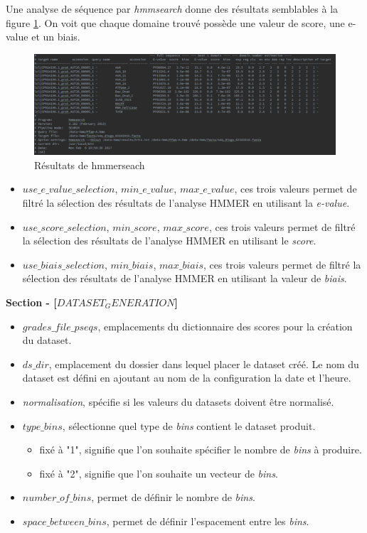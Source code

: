 Une analyse de séquence par \emph{hmmsearch} donne des résultats semblables à la figure \ref{fig:hmmseach}. On voit que chaque domaine trouvé possède une valeur de score, une e-value et un biais.

\begin{figure}[H] 
\centering 
\includegraphics[width=1\columnwidth]{img/hmmsearchresult} 
\caption[hmmseach]{Résultats de hmmerseach}
\label{fig:hmmseach} 
\end{figure}

\begin{itemize}
\item \emph{$use\_e\_value\_selection$}, \emph{$min\_e\_value$}, \emph{$max\_e\_value$}, ces trois valeurs permet de filtré la sélection des résultats de l'analyse HMMER en utilisant la \emph{e-value}.
\item \emph{$use\_score\_selection$}, \emph{$min\_score$}, \emph{$max\_score$}, ces trois valeurs permet de filtré la sélection des résultats de l'analyse HMMER en utilisant le \emph{score}.
\item \emph{$use\_biais\_selection$}, \emph{$min\_biais$}, \emph{$max\_biais$}, ces trois valeurs permet de filtré la sélection des résultats de l'analyse HMMER en utilisant la valeur de  \emph{biais}.
\end{itemize}

\textbf{Section - [$DATASET_GENERATION$]}

\begin{itemize}
\item \emph{$grades\_file\_pseqs$}, emplacements du dictionnaire des scores pour la création du dataset.
\item \emph{$ds\_dir$}, emplacement du dossier dans lequel placer le dataset créé. Le nom du dataset est défini en ajoutant au nom de la configuration la date et l'heure.
\item \emph{normalisation}, spécifie si les valeurs du datasets doivent être normalisé.
\item \emph{$type\_bins$}, sélectionne quel type de \emph{bins} contient le dataset produit.
\begin{itemize}
\item fixé à "1", signifie que l'on souhaite spécifier le nombre de \emph{bins} à produire.
\item fixé à "2", signifie que l'on souhaite un vecteur de \emph{bins}.
\end{itemize}
\item \emph{$number\_of\_bins$}, permet de définir le nombre de \emph{bins}.
\item \emph{$space\_between\_bins$}, permet de définir l'espacement entre les \emph{bins}.
\end{itemize}

